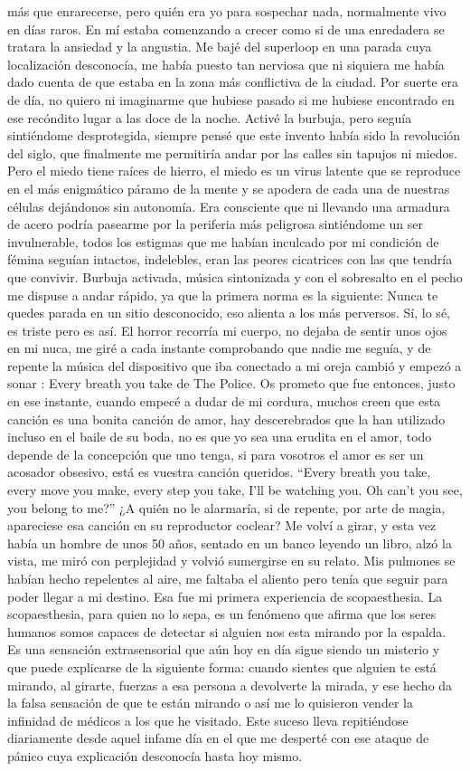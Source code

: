 más que enrarecerse, pero quién era yo para sospechar nada, normalmente vivo en días raros. En mí estaba comenzando a crecer como si de una enredadera se tratara la ansiedad y la angustia. Me bajé del superloop en una parada cuya localización desconocía, me había puesto tan nerviosa que ni siquiera me había dado cuenta de que estaba en la zona más conflictiva de la ciudad. Por suerte era de día, no quiero ni imaginarme que hubiese pasado si me hubiese encontrado en ese recóndito lugar a las doce de la noche. Activé la burbuja, pero seguía sintiéndome desprotegida, siempre pensé que este invento había sido la revolución del siglo, que finalmente me permitiría andar por las calles sin tapujos ni miedos. Pero el miedo tiene raíces de hierro, el miedo es un virus latente que se reproduce en el más enigmático páramo de la mente y se apodera de cada una de nuestras células dejándonos sin autonomía. Era consciente que ni llevando una armadura de acero podría pasearme por la periferia más peligrosa sintiéndome un ser invulnerable, todos los estigmas que me habían inculcado por mi condición de fémina seguían intactos, indelebles, eran las peores cicatrices con las que tendría que convivir.  Burbuja activada, música sintonizada y con el sobresalto en el pecho me dispuse a andar rápido, ya que la primera norma es la siguiente:  Nunca te quedes parada en un sitio desconocido, eso alienta a los más perversos.  Sí, lo sé, es triste pero es así. El horror recorría mi cuerpo, no dejaba de sentir unos ojos en mi nuca, me giré a cada instante comprobando que nadie me seguía, y de repente la música del dispositivo que iba conectado a mi oreja cambió y empezó a sonar : Every breath you take de The Police.  Os prometo que fue entonces, justo en ese instante, cuando empecé a dudar de mi cordura, muchos creen que esta canción es una bonita canción de amor, hay descerebrados que la han utilizado incluso en el baile de su boda, no es que yo sea una erudita en el amor, todo depende de la concepción que uno tenga, si para vosotros el amor es ser un acosador obsesivo, está es vuestra canción queridos. ``Every breath you take, every move you make, every step you take, I’ll be watching you. Oh can’t you see, you belong to me?'' ¿A quién no le alarmaría, si de repente, por arte de magia, apareciese esa canción en su reproductor coclear? Me volví a girar, y esta vez había un hombre de unos 50 años, sentado en un banco leyendo un libro, alzó la vista, me miró con perplejidad y volvió sumergirse en su relato. Mis pulmones se habían hecho repelentes al aire, me faltaba el aliento pero tenía que seguir para poder llegar a mi destino. Esa fue mi primera experiencia de scopaesthesia. La scopaesthesia, para quien no lo sepa, es un fenómeno que afirma que los seres humanos somos capaces de detectar si alguien nos esta mirando por la espalda. Es una sensación extrasensorial que aún hoy en día sigue siendo un misterio y que puede explicarse de la siguiente forma: cuando sientes que alguien te está mirando, al girarte, fuerzas a esa persona a devolverte la mirada, y ese hecho da la falsa sensación de que te están mirando o así me lo quisieron vender la infinidad de médicos a los que he visitado. Este suceso lleva repitiéndose diariamente desde aquel infame día en el que me desperté con ese ataque de pánico cuya explicación desconocía hasta hoy mismo. 